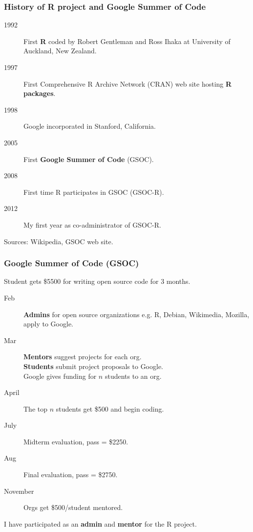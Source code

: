 \documentclass{beamer}
\begin{document}





\begin{frame}
  \frametitle{History of R project and Google Summer of Code}
  \begin{description}
  \item[1992] First \textbf{R} coded by Robert Gentleman and Ross
    Ihaka at University of Auckland, New Zealand.
  \item[1997] First Comprehensive R Archive Network (CRAN) web site
    hosting \textbf{R packages}.
  \item[1998] Google incorporated in Stanford, California.
  \item[2005] First \textbf{Google Summer of Code} (GSOC).
  \item[2008] First time R participates in GSOC (GSOC-R).
  \item[2012] My first year as co-administrator of GSOC-R.
  \end{description}
  Sources: Wikipedia, GSOC web site.
\end{frame}

\begin{frame}
  \frametitle{Google Summer of Code (GSOC)}
Student gets \$5500 for writing open source code for
    3 months.
    \begin{description}
    \item[Feb] \textbf{Admins} for open source organizations
      e.g. R, Debian, Wikimedia, Mozilla, apply to Google.
    \item[Mar] \textbf{Mentors} suggest projects for each org.\\
      \textbf{Students} submit project proposals to Google.\\
      Google gives funding for $n$ students to an org.
    \item[April] The top $n$ students get \$500 and begin coding.
    \item[July] Midterm evaluation, pass = \$2250.
    \item[Aug] Final evaluation, pass = \$2750.
    \item[November] Orgs get \$500/student mentored.
    \end{description}
  I have participated as an \textbf{admin} and \textbf{mentor} for the
  R project.
\end{frame}
\end{document}
